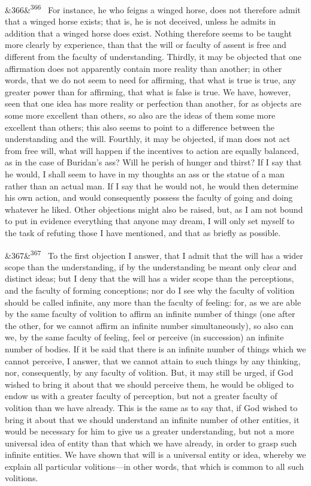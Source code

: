 \documentclass[12pt]{article}
\newcommand{\para}[1][]{\par\noindent\ifx&#1&\else\textsuperscript{\footnotesize #1}~\fi}
\begin{document}
\para[366] For instance, he who feigns a winged horse, does not therefore admit that a winged horse exists; that is, he is not deceived, unless he admits in addition that a winged horse does exist. Nothing therefore seems to be taught more clearly by experience, than that the will or faculty of assent is free and different from the faculty of understanding. Thirdly, it may be objected that one affirmation does not apparently contain more reality than another; in other words, that we do not seem to need for affirming, that what is true is true, any greater power than for affirming, that what is false is true. We have, however, seen that one idea has more reality or perfection than another, for as objects are some more excellent than others, so also are the ideas of them some more excellent than others; this also seems to point to a difference between the understanding and the will. Fourthly, it may be objected, if man does not act from free will, what will happen if the incentives to action are equally balanced, as in the case of Buridan's ass? Will he perish of hunger and thirst? If I say that he would, I shall seem to have in my thoughts an ass or the statue of a man rather than an actual man. If I say that he would not, he would then determine his own action, and would consequently possess the faculty of going and doing whatever he liked. Other objections might also be raised, but, as I am not bound to put in evidence everything that anyone may dream, I will only set myself to the task of refuting those I have mentioned, and that as briefly as possible.

\para[367] To the first objection I answer, that I admit that the will has a wider scope than the understanding, if by the understanding be meant only clear and distinct ideas; but I deny that the will has a wider scope than the perceptions, and the faculty of forming conceptions; nor do I see why the faculty of volition should be called infinite, any more than the faculty of feeling: for, as we are able by the same faculty of volition to affirm an infinite number of things (one after the other, for we cannot affirm an infinite number simultaneously), so also can we, by the same faculty of feeling, feel or perceive (in succession) an infinite number of bodies. If it be said that there is an infinite number of things which we cannot perceive, I answer, that we cannot attain to such things by any thinking, nor, consequently, by any faculty of volition. But, it may still be urged, if God wished to bring it about that we should perceive them, he would be obliged to endow us with a greater faculty of perception, but not a greater faculty of volition than we have already. This is the same as to say that, if God wished to bring it about that we should understand an infinite number of other entities, it would be necessary for him to give us a greater understanding, but not a more universal idea of entity than that which we have already, in order to grasp such infinite entities. We have shown that will is a universal entity or idea, whereby we explain all particular volitions---in other words, that which is common to all such volitions.
\end{document}
